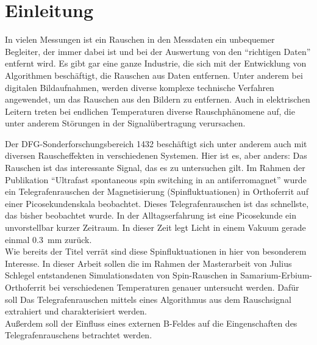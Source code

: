 \documentclass[main.tex]{subfiles}
\begin{document}
\section{Einleitung}


In vielen Messungen ist ein Rauschen in den Messdaten ein unbequemer Begleiter, der immer dabei ist und bei der Auswertung von den \enquote{richtigen Daten} entfernt wird. 
Es gibt gar eine ganze Industrie, die sich mit der Entwicklung von Algorithmen beschäftigt, die Rauschen aus Daten entfernen. Unter anderem bei digitalen Bildaufnahmen, werden diverse komplexe technische Verfahren angewendet, um das Rauschen aus den Bildern zu entfernen. Auch in elektrischen Leitern treten bei endlichen Temperaturen diverse Rauschphänomene auf, die unter anderem Störungen in der Signalübertragung verursachen.\\ 

Der DFG-Sonderforschungsbereich 1432 \cite{sfb-1432} beschäftigt sich unter anderem auch mit diversen Rauscheffekten in verschiedenen Systemen.
Hier ist es, aber anders: Das Rauschen ist das interessante Signal, das es zu untersuchen gilt. Im Rahmen der Publikation \enquote{Ultrafast spontaneous spin switching in an antiferromagnet} \cite{weiss-ultrafast} wurde ein Telegrafenrauschen der Magnetisierung (Spinfluktuationen) in Orthoferrit auf einer Picosekundenskala beobachtet. Dieses Telegrafenrauschen ist das schnellste, das bisher beobachtet wurde.  In der Alltagserfahrung ist eine Picosekunde ein unvorstellbar kurzer Zeitraum. In dieser Zeit legt Licht in einem Vakuum gerade einmal \SI{0.3}{\milli\meter} zurück.\\

Wie bereits der Titel verrät sind diese Spinfluktuationen in  hier von besonderem Interesse.
In dieser Arbeit sollen die im Rahmen der Masterarbeit von Julius Schlegel \cite{schlegel-master} entstandenen Simulationsdaten von Spin-Rauschen in Samarium-Erbium-Orthoferrit bei verschiedenen Temperaturen genauer untersucht werden. Dafür soll Das Telegrafenrauschen mittels eines Algorithmus aus dem Rauschsignal extrahiert und charakterisiert werden.\\
Außerdem soll der Einfluss eines externen B-Feldes auf die Eingenschaften des Telegrafenrauschens betrachtet werden.


\end{document}
